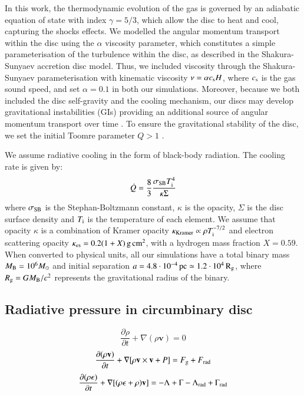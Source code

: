 \documentclass{aa}
\begin{document}
In this work, the thermodynamic evolution of the gas is governed by an adiabatic equation of state with index $\gamma = 5/3$, which allow the disc to heat and cool, capturing the shocks effects. 
We modelled the angular momentum transport within the disc using the $\alpha$ viscosity parameter, which constitutes a simple parameterisation of the turbulence within the disc, as described in the Shakura-Sunyaev accretion disc model. Thus, we included viscosity  through the Shakura-Sunyaev parameterisation with kinematic viscosity $\nu = \alpha c_{\rm s } H$, where $c_{\rm s}$ is the gas sound speed, and set $\alpha=0.1$ in both our simulations. Moreover, because we both included the disc self-gravity and the cooling mechanism, our discs may develop gravitational instabilities (GIs) providing an additional source of angular momentum transport over time \citep{lodatorice2004,Lodatorice2005,lodato2007sg}. To ensure the gravitational stability of the disc, we set the initial Toomre parameter $Q > 1$ \citep{Toomre1964}.


We assume radiative cooling in the form of black-body radiation. The cooling rate is given by: 
\begin{equation}
        \label{eqn:cooling}
        \dot Q = \frac{8}{3} \frac{\sigma_{\rm SB} T_{\rm i}^4}{\kappa \Sigma}
\end{equation}
where $\sigma_{\rm SB}$ is the Stephan-Boltzmann constant, $\kappa$ is the opacity, $\Sigma$ is the disc surface density and $ T_{\rm i} $ is the temperature of each element.
We assume that opacity $\kappa$ is a combination of Kramer opacity $ \kappa_{\rm Kramer} \propto \rho T_{\rm i} ^{-7/2} $ and electron scattering opacity $ \kappa_{\rm es} = 0.2 (1+X) \, \mbox{g}\, \mbox{cm}^2$, with a hydrogen mass fraction $ X=0.59$.
When converted to physical units, all our simulations have a total binary mass $M_{\rm B}= 10^6 M_{\odot}$ and initial separation
$a=4.8 \cdot 10^{-4} \, \rm{pc} \simeq 1.2 \cdot 10^4 \, R_{\rm g}$, where $R_{\rm g} = GM_{\rm B}/c^2$ represents the gravitational radius of the binary. 

\subsection{Radiative pressure in circumbinary disc} 
\label{sec:Prad}

\begin{equation}
    \label{eqn:cons_massa}
    \frac{\partial{\rho}}{\partial{t}} + \nabla(\rho \mathbf{v}) = 0 
\end{equation}
\begin{equation}
    \label{eqn:cons_qm}
    \frac{\partial{(\rho \mathbf{v}})}{\partial{t}} + \nabla[\rho \mathbf{v} \times \mathbf{v}+P] = F_{\rm g} + F_{\rm rad} 
\end{equation}
\begin{equation}
    \label{eqn:var_en}
    \frac{\partial{(\rho \epsilon})}{\partial{t}} + \nabla[(\rho \epsilon + \rho)\mathbf{v}] = - \Lambda + \Gamma - \Lambda_{\rm rad} + \Gamma_{\rm rad}
\end{equation}
\end{document}
